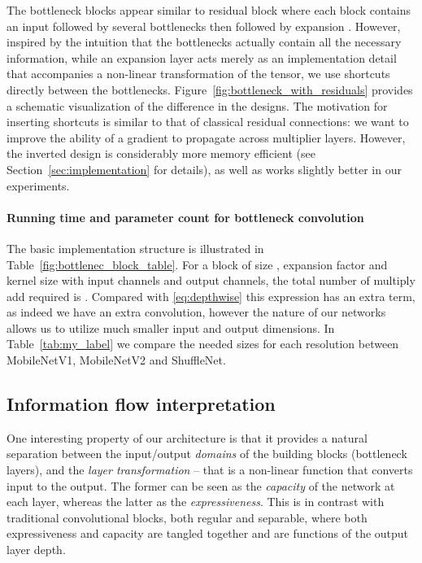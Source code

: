 \documentclass[10pt,twocolumn,letterpaper]{article}
\begin{document}
The bottleneck blocks appear similar to residual block where each block contains an input followed by several bottlenecks then followed by expansion \cite{ResNet}.
However, inspired by the intuition that the bottlenecks actually contain all the necessary information, while an expansion layer acts merely as an implementation detail that accompanies a non-linear transformation of the tensor, we use shortcuts directly between the bottlenecks.
Figure~\ref{fig:bottleneck_with_residuals} provides a schematic visualization of the difference in the designs.
The motivation for inserting shortcuts is similar to that of classical residual connections: we want to improve the ability of a gradient to propagate across  multiplier layers.
However, the inverted design is considerably more memory efficient (see Section~\ref{sec:implementation} for details), as well as works slightly better in our experiments. 


\paragraph{Running time and parameter count for bottleneck convolution}
The basic implementation structure is illustrated in Table~\ref{fig:bottlenec_block_table}.
For a block of size , expansion factor  and kernel size  with  input channels and  output channels, the total number of multiply add required is 
.
Compared with \eqref{eq:depthwise} this expression has an extra term, as indeed we have an extra  convolution, however the nature of our networks allows us to utilize much smaller input and output dimensions.
In Table~\ref{tab:my_label} we compare the needed sizes for each resolution between \mbox{MobileNetV1}, \mbox{MobileNetV2} and \mbox{ShuffleNet}.


\subsection{Information flow interpretation}
\label{sec:information-flow}
One interesting property of our architecture is that it provides a natural separation between the input/output {\em domains} of the building blocks (bottleneck layers), and the {\em layer transformation} -- that is a non-linear function that converts input to the output.
The former can be seen as the {\em capacity} of the network at each layer, whereas the latter as the {\em expressiveness}.
This is in contrast with traditional convolutional blocks, both regular and separable, where both expressiveness and capacity are tangled together and are functions of the output layer depth.
\end{document}
